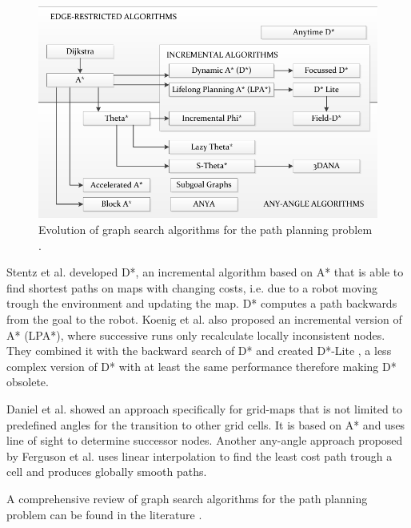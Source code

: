\documentclass[]{article}
\begin{document}
\begin{figure}[h] \centering
  \includegraphics[scale=.35]{graph_search_algorithms}
  \caption{Evolution of graph search algorithms for the path planning
    problem \cite{sanchez-ibanezPathPlanningAutonomous2021}.}
  \label{fig:graph-search}
\end{figure}

Stentz et al. developed D*, an incremental algorithm based on A* that
is able to find shortest paths on maps with changing costs, i.e. due
to a robot moving trough the environment and updating the map. D*
computes a path backwards from the goal to the robot. Koenig et
al. \cite{koenigIncremental2001} also proposed an incremental version
of A* (LPA*), where successive runs only recalculate locally
inconsistent nodes. They combined it with the backward search of D*
and created D*-Lite \cite{koenigLite2002}, a less complex version of
D* with at least the same performance therefore making D* obsolete.

Daniel et al. \cite{danielThetaAnyAnglePath2010} showed an approach
specifically for grid-maps that is not limited to predefined angles
for the transition to other grid cells. It is based on A* and uses
line of sight to determine successor nodes. Another any-angle approach
proposed by Ferguson et al.  \cite{fergusonFieldAlgorithmImproved2005}
uses linear interpolation to find the least cost path trough a cell
and produces globally smooth paths.

A comprehensive review of graph search algorithms for the path
planning problem can be found in the literature
\cite{aitsaadiUAVPathPlanning2022,sanchez-ibanezPathPlanningAutonomous2021,yanComprehensiveSurveyAnalysis2020,nashAnyAnglePathPlanning2013}.
\end{document}
